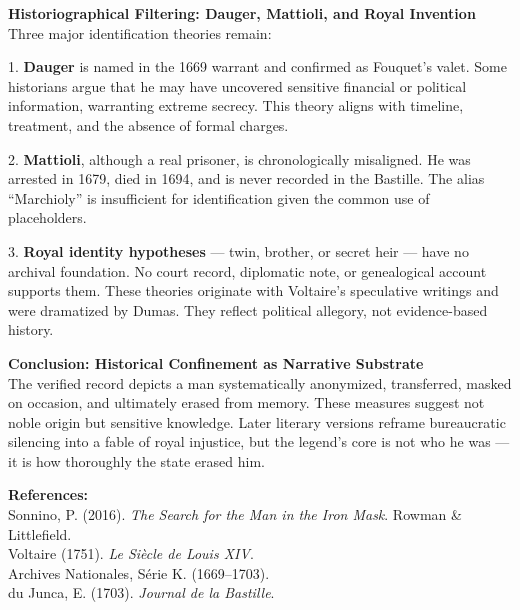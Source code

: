 \begin{technical}
\textbf{Historiographical Filtering: Dauger, Mattioli, and Royal Invention}\\[0.3em]
Three major identification theories remain:

1. \textbf{Dauger} is named in the 1669 warrant and confirmed as Fouquet’s valet. Some historians argue that he may have uncovered sensitive financial or political information, warranting extreme secrecy. This theory aligns with timeline, treatment, and the absence of formal charges.

2. \textbf{Mattioli}, although a real prisoner, is chronologically misaligned. He was arrested in 1679, died in 1694, and is never recorded in the Bastille. The alias “Marchioly” is insufficient for identification given the common use of placeholders.

3. \textbf{Royal identity hypotheses} — twin, brother, or secret heir — have no archival foundation. No court record, diplomatic note, or genealogical account supports them. These theories originate with Voltaire’s speculative writings and were dramatized by Dumas. They reflect political allegory, not evidence-based history.

\textbf{Conclusion: Historical Confinement as Narrative Substrate}\\[0.3em]
The verified record depicts a man systematically anonymized, transferred, masked on occasion, and ultimately erased from memory. These measures suggest not noble origin but sensitive knowledge. Later literary versions reframe bureaucratic silencing into a fable of royal injustice, but the legend’s core is not who he was — it is how thoroughly the state erased him.

\vspace{0.5em}
\textbf{References:}\\
Sonnino, P. (2016). \textit{The Search for the Man in the Iron Mask}. Rowman \& Littlefield.\\
Voltaire (1751). \textit{Le Siècle de Louis XIV}.\\
Archives Nationales, Série K. (1669–1703).\\
du Junca, E. (1703). \textit{Journal de la Bastille}.
\end{technical}
